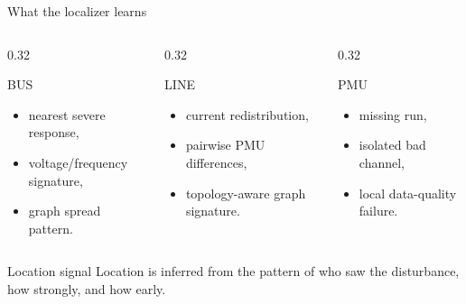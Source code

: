 \documentclass[10pt,aspectratio=169]{beamer}
\begin{document}
\begin{frame}{What the localizer learns}
\small
\begin{columns}[T,totalwidth=\textwidth]
\begin{column}{0.32\textwidth}
\begin{block}{BUS}
\begin{itemize}
  \item nearest severe response,
  \item voltage/frequency signature,
  \item graph spread pattern.
\end{itemize}
\end{block}
\end{column}
\begin{column}{0.32\textwidth}
\begin{block}{LINE}
\begin{itemize}
  \item current redistribution,
  \item pairwise PMU differences,
  \item topology-aware graph signature.
\end{itemize}
\end{block}
\end{column}
\begin{column}{0.32\textwidth}
\begin{block}{PMU}
\begin{itemize}
  \item missing run,
  \item isolated bad channel,
  \item local data-quality failure.
\end{itemize}
\end{block}
\end{column}
\end{columns}
\vspace{2mm}
\begin{alertblock}{Location signal}
Location is inferred from the pattern of who saw the disturbance, how strongly, and how early.
\end{alertblock}
\end{frame}
\end{document}
